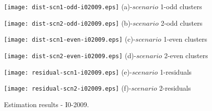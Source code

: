 \begin{figure}
     \begin{minipage}[h]{0.5\linewidth}
        \centering
        \texttt{[image: dist-scn1-odd-i02009.eps]}
				\footnotesize{(a)-$scenario$ 1-odd clusters}
     \end{minipage}
\vspace{3.00mm}
    \begin{minipage}[h]{0.5\linewidth}
       \centering
       \texttt{[image: dist-scn2-odd-i02009.eps]}
			\footnotesize{(b)-$scenario$ 2-odd clusters}
     \end{minipage}
\vspace{3.00mm}
    \begin{minipage}[h]{0.5\linewidth}
       \centering
       \texttt{[image: dist-scn1-even-i02009.eps]}
			\footnotesize{(c)-$scenario$ 1-even clusters}
     \end{minipage}
\vspace{3.00mm}
    \begin{minipage}[h]{0.5\linewidth}
       \centering
       \texttt{[image: dist-scn2-even-i02009.eps]}
			\footnotesize{(d)-$scenario$ 2-even clusters}
     \end{minipage}
\vspace{3.00mm}
    \begin{minipage}[h]{0.5\linewidth}
       \centering
       \texttt{[image: residual-scn1-i02009.eps]}
			\footnotesize{(e)-$scenario$ 1-residuals}
     \end{minipage}
\vspace{3.00mm}
    \begin{minipage}[h]{0.5\linewidth}
       \centering
       \texttt{[image: residual-scn2-i02009.eps]}
			\footnotesize{(f)-$scenario$ 2-residuals}
     \end{minipage}
		\caption{Estimation results - I0-2009.}
\label{fig6}
\end{figure}

